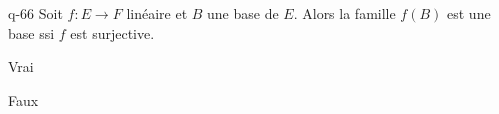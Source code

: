 \begin{truefalse}{q-66}
Soit $f : E \to F$ linéaire et $B$  une base de $E$. Alors la famille $f(B)$ est une base ssi $f$ est surjective.
\item Vrai
\item* Faux
\end{truefalse}

